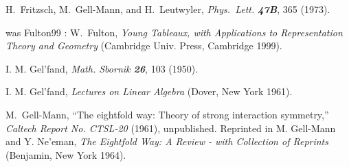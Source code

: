

H.~Fritzsch, M.~Gell-Mann, and H.~Leutwyler,
{\em Phys.~Lett.  \bf 47B}, 365 (1973).



was Fulton99 :
 W.~Fulton,
     {\em Young Tableaux, with Applications to
          Representation Theory and Geometry}
        (Cambridge Univ. Press, Cambridge  1999).


 I. M. Gel'fand,
    {\em Math. Sbornik \bf 26}, 103 (1950).

 I. M. Gel'fand,
        {\em Lectures on Linear Algebra}
        (Dover, New York 1961).


 M.~Gell-Mann,
    ``The eightfold way: Theory of strong interaction symmetry,''
    {\em Caltech Report No. CTSL-20} (1961), unpublished.
    Reprinted in M. Gell-Mann and Y. Ne'eman,
    {\em The Eightfold Way: A Review - with Collection of Reprints}
    (Benjamin, New York 1964).
%

%

